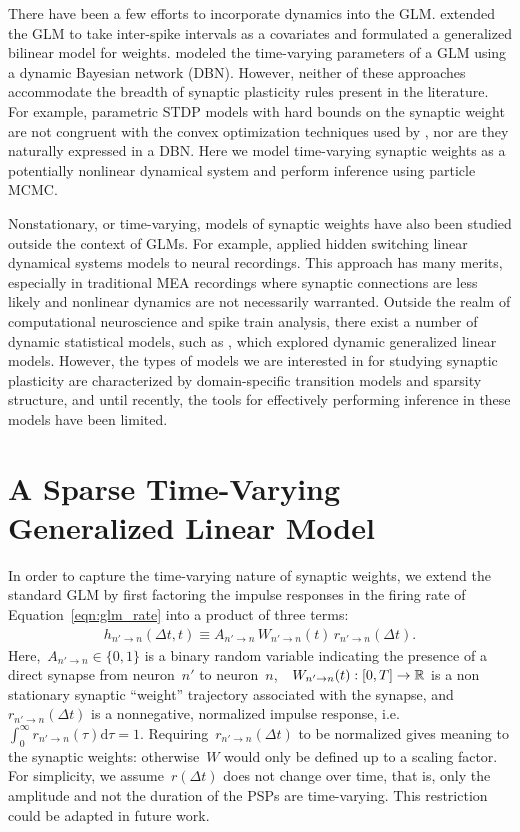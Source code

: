 There have been a few efforts to incorporate dynamics into the GLM. \citet{Stevenson-2011} extended the GLM to take inter-spike intervals as a covariates and formulated a generalized bilinear model for weights. \citet{Eldawlatly-2010} modeled the time-varying parameters of a GLM using a dynamic Bayesian network (DBN). However, neither of these approaches accommodate the breadth of synaptic plasticity rules present in the literature. For example, parametric STDP models with hard bounds on the synaptic weight are not congruent with the convex optimization techniques used by \cite{Stevenson-2011}, nor are they naturally expressed in a DBN. Here we model time-varying synaptic weights as a potentially nonlinear dynamical system and perform inference using particle MCMC.

Nonstationary, or time-varying, models of synaptic weights have also been studied outside the context of GLMs. For example, \citet{Petreska-2011} applied hidden switching linear dynamical systems models to neural recordings. This approach has many merits, especially in traditional MEA recordings where synaptic connections are less likely and nonlinear dynamics are not necessarily warranted. Outside the realm of computational neuroscience and spike train analysis, there exist a number of dynamic statistical models, such as \citet{West-1985}, which explored dynamic generalized linear models. However, the types of models we are interested in for studying synaptic plasticity are characterized by domain-specific transition models and sparsity structure, and until recently, the tools for effectively performing inference in these models have been limited. 


\section{A Sparse Time-Varying Generalized Linear Model}
In order to capture the time-varying nature of synaptic weights, we extend the standard GLM by  first factoring the impulse responses in the firing rate of Equation~\ref{eqn:glm_rate} into a product of three terms:
\begin{align}
\label{eqn:tvwglm_ir}
h_{n' \to n}(\Delta t, t) \equiv A_{n'\to n}\,W_{n' \to n}(t)\,r_{n' \to n}(\Delta t).
\end{align}%
Here,~${A_{n'\to n}\in\{0,1\}}$ is a binary random variable indicating the presence of a direct synapse from neuron~$n'$ to neuron~$n$,~~${W_{n'\to n}(t): [0,T]\to \mathbb{R}}$ is a non stationary synaptic ``weight'' trajectory associated with the synapse, and~$r_{n' \to n}(\Delta t)$ is a nonnegative, normalized impulse response, i.e. ~${\int_0^\infty r_{n' \to n}(\tau)\mathrm{d}\tau = 1}$. Requiring~${r_{n' \to n}(\Delta t)}$ to be normalized gives meaning to the synaptic weights: otherwise~$W$ would only be defined up to a scaling factor. For simplicity, we assume~$r(\Delta t)$ does not change over time, that is, only the amplitude and not the duration of the PSPs are time-varying. This restriction could be adapted in future work.

